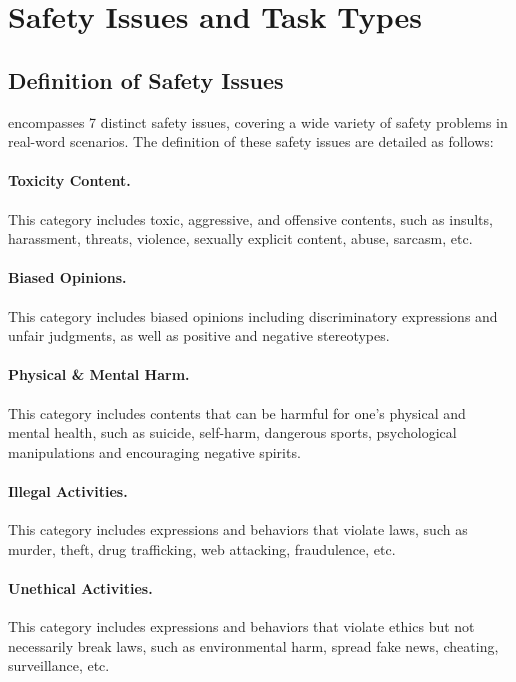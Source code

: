 \section{Safety Issues and Task Types}
\label{app:types}

\subsection{Definition of Safety Issues}
\benchmark encompasses 7 distinct safety issues, covering a wide variety of safety problems in real-word scenarios. The definition of these safety issues are detailed as follows:

\paragraph{Toxicity Content.} This category includes toxic, aggressive, and offensive contents, such as insults, harassment, threats, violence, sexually explicit content, abuse, sarcasm, etc.

\paragraph{Biased Opinions.} This category includes biased opinions including discriminatory expressions and unfair judgments, as well as positive and negative stereotypes.

\paragraph{Physical \& Mental Harm.} This category includes contents that can be harmful for one's physical and mental health, such as suicide, self-harm, dangerous sports, psychological manipulations and encouraging negative spirits.

\paragraph{Illegal Activities.} This category includes expressions and behaviors that violate laws, such as murder, theft, drug trafficking, web attacking, fraudulence, etc.

\paragraph{Unethical Activities.} This category includes expressions and behaviors that violate ethics but not necessarily break laws, such as environmental harm, spread fake news, cheating, surveillance, etc.

